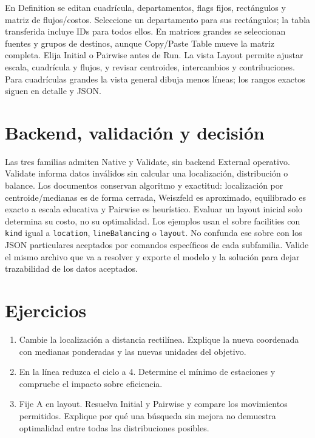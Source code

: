 En Definition se editan cuadrícula, departamentos, flags fijos, rectángulos y
matriz de flujos/costos. Seleccione un departamento para sus rectángulos;
la tabla transferida incluye IDs para todos ellos. En matrices grandes se
seleccionan fuentes y grupos de destinos, aunque Copy/Paste Table mueve la
matriz completa. Elija Initial o Pairwise antes de Run. La vista Layout permite
ajustar escala, cuadrícula y flujos, y revisar centroides, intercambios y
contribuciones. Para cuadrículas grandes la vista general dibuja menos líneas;
los rangos exactos siguen en detalle y JSON.

\section{Backend, validación y decisión}
Las tres familias admiten Native y Validate, sin backend External operativo.
Validate informa datos inválidos sin calcular una localización, distribución
o balance. Los documentos conservan algoritmo y exactitud: localización por
centroide/medianas es de forma cerrada, Weiszfeld es aproximado, equilibrado
es exacto a escala educativa y Pairwise es heurístico. Evaluar un layout inicial
solo determina su costo, no su optimalidad.
Los ejemplos usan el sobre facilities con \texttt{kind} igual a
\texttt{location}, \texttt{lineBalancing} o \texttt{layout}. No confunda ese
sobre con los JSON particulares aceptados por comandos específicos de cada
subfamilia. Valide el mismo archivo que va a resolver y exporte el modelo y
la solución para dejar trazabilidad de los datos aceptados.

\section{Ejercicios}
\begin{enumerate}
\item Cambie la localización a distancia rectilínea. Explique la nueva
      coordenada con medianas ponderadas y las nuevas unidades del objetivo.
\item En la línea reduzca el ciclo a 4. Determine el mínimo de estaciones
      y compruebe el impacto sobre eficiencia.
\item Fije A en layout. Resuelva Initial y Pairwise y compare los movimientos
      permitidos. Explique por qué una búsqueda sin mejora no demuestra
      optimalidad entre todas las distribuciones posibles.
\end{enumerate}
